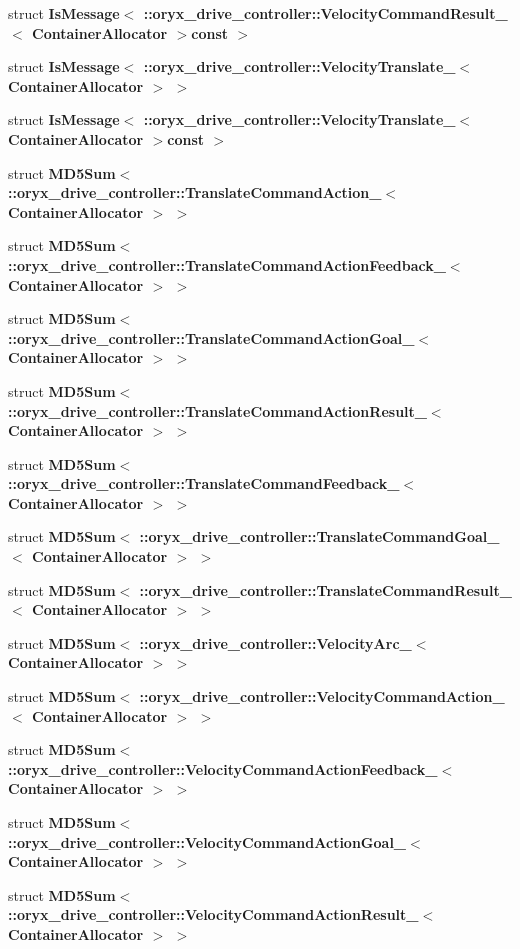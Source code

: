 \begin{DoxyCompactItemize}
struct {\bf \-Is\-Message$<$ \-::oryx\-\_\-drive\-\_\-controller\-::\-Velocity\-Command\-Result\-\_\-$<$ Container\-Allocator $>$const  $>$}
\item 
struct {\bf \-Is\-Message$<$ \-::oryx\-\_\-drive\-\_\-controller\-::\-Velocity\-Translate\-\_\-$<$ Container\-Allocator $>$ $>$}
\item 
struct {\bf \-Is\-Message$<$ \-::oryx\-\_\-drive\-\_\-controller\-::\-Velocity\-Translate\-\_\-$<$ Container\-Allocator $>$const  $>$}
\item 
struct {\bf \-M\-D5\-Sum$<$ \-::oryx\-\_\-drive\-\_\-controller\-::\-Translate\-Command\-Action\-\_\-$<$ Container\-Allocator $>$ $>$}
\item 
struct {\bf \-M\-D5\-Sum$<$ \-::oryx\-\_\-drive\-\_\-controller\-::\-Translate\-Command\-Action\-Feedback\-\_\-$<$ Container\-Allocator $>$ $>$}
\item 
struct {\bf \-M\-D5\-Sum$<$ \-::oryx\-\_\-drive\-\_\-controller\-::\-Translate\-Command\-Action\-Goal\-\_\-$<$ Container\-Allocator $>$ $>$}
\item 
struct {\bf \-M\-D5\-Sum$<$ \-::oryx\-\_\-drive\-\_\-controller\-::\-Translate\-Command\-Action\-Result\-\_\-$<$ Container\-Allocator $>$ $>$}
\item 
struct {\bf \-M\-D5\-Sum$<$ \-::oryx\-\_\-drive\-\_\-controller\-::\-Translate\-Command\-Feedback\-\_\-$<$ Container\-Allocator $>$ $>$}
\item 
struct {\bf \-M\-D5\-Sum$<$ \-::oryx\-\_\-drive\-\_\-controller\-::\-Translate\-Command\-Goal\-\_\-$<$ Container\-Allocator $>$ $>$}
\item 
struct {\bf \-M\-D5\-Sum$<$ \-::oryx\-\_\-drive\-\_\-controller\-::\-Translate\-Command\-Result\-\_\-$<$ Container\-Allocator $>$ $>$}
\item 
struct {\bf \-M\-D5\-Sum$<$ \-::oryx\-\_\-drive\-\_\-controller\-::\-Velocity\-Arc\-\_\-$<$ Container\-Allocator $>$ $>$}
\item 
struct {\bf \-M\-D5\-Sum$<$ \-::oryx\-\_\-drive\-\_\-controller\-::\-Velocity\-Command\-Action\-\_\-$<$ Container\-Allocator $>$ $>$}
\item 
struct {\bf \-M\-D5\-Sum$<$ \-::oryx\-\_\-drive\-\_\-controller\-::\-Velocity\-Command\-Action\-Feedback\-\_\-$<$ Container\-Allocator $>$ $>$}
\item 
struct {\bf \-M\-D5\-Sum$<$ \-::oryx\-\_\-drive\-\_\-controller\-::\-Velocity\-Command\-Action\-Goal\-\_\-$<$ Container\-Allocator $>$ $>$}
\item 
struct {\bf \-M\-D5\-Sum$<$ \-::oryx\-\_\-drive\-\_\-controller\-::\-Velocity\-Command\-Action\-Result\-\_\-$<$ Container\-Allocator $>$ $>$}

\end{DoxyCompactItemize}

